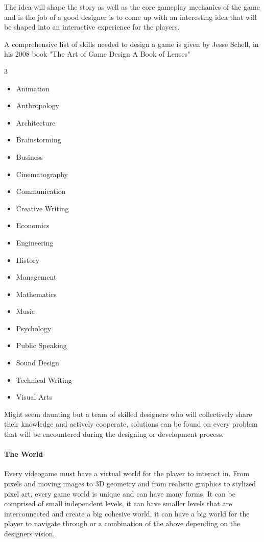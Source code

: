 \documentclass[a4paper,one side,12pt]{book}
\begin{document}
The idea will shape the story as well as the core gameplay mechanics of
the game and is the job of a good designer is to come up with an
interesting idea that will be shaped into an interactive experience for
the players.

A comprehensive list of skills needed to design a game is given by Jesse
Schell, in his 2008 book "The Art of Game Design A Book of
Lenses"\cite{schell_2008_art}

\begin{multicols}{3}
\begin{itemize}
\item 
  Animation 
\item 
  Anthropology
\item  
  Architecture 
\item 
  Brainstorming 
\item 
  Business 
\item 
  Cinematography 
\item 
  Communication 
\item 
  Creative Writing
\item 
  Economics 
\item 
  Engineering
\item 
  History 
\item 
  Management 
\item 
  Mathematics 
\item 
  Music 
\item 
  Psychology 
\item 
  Public Speaking
\item 
  Sound Design
\item 
  Technical Writing
\item 
  Visual Arts
\end{itemize}
\end{multicols}

Might seem daunting but a team of skilled designers who will
collectively share their knowledge and actively cooperate, solutions can
be found on every problem that will be encountered during the designing
or development process.

\paragraph{The World\\}

Every videogame must have a virtual world for the player to interact in.
From pixels and moving images to 3D geometry and from realistic graphics
to stylized pixel art, every game world is unique and can have many
forms. It can be comprised of small independent levels, it can have
smaller levels that are interconnected and create a big cohesive world,
it can have a big world for the player to navigate through or a
combination of the above depending on the designers\textquotesingle{}
vision.
\end{document}
